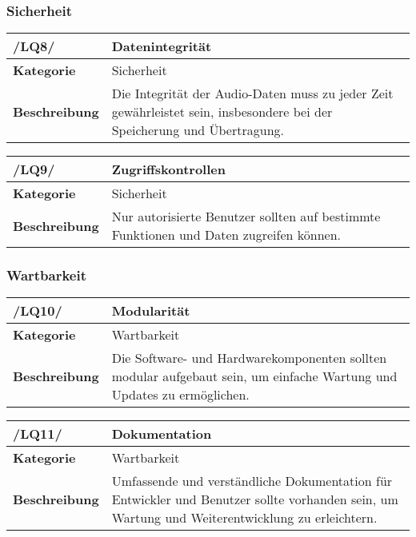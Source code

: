 \subsubsection{Sicherheit}

\begin{table}[h!]
\begin{tabularx}{13cm}{|l|X|}
\hline
\textbf{/LQ8/} & \textbf{Datenintegrität} \\ \hline
\textbf{Kategorie} & Sicherheit \\ \hline
\textbf{Beschreibung} & Die Integrität der Audio-Daten muss zu jeder Zeit gewährleistet sein, insbesondere bei der Speicherung und Übertragung. \\ \hline
\end{tabularx}
\end{table}

\begin{table}[h!]
\begin{tabularx}{13cm}{|l|X|}
\hline
\textbf{/LQ9/} & \textbf{Zugriffskontrollen} \\ \hline
\textbf{Kategorie} & Sicherheit \\ \hline
\textbf{Beschreibung} & Nur autorisierte Benutzer sollten auf bestimmte Funktionen und Daten zugreifen können. \\ \hline
\end{tabularx}
\end{table}

\subsubsection{Wartbarkeit}

\begin{table}[h!]
\begin{tabularx}{13cm}{|l|X|}
\hline
\textbf{/LQ10/} & \textbf{Modularität} \\ \hline
\textbf{Kategorie} & Wartbarkeit \\ \hline
\textbf{Beschreibung} & Die Software- und Hardwarekomponenten sollten modular aufgebaut sein, um einfache Wartung und Updates zu ermöglichen. \\ \hline
\end{tabularx}
\end{table}

\begin{table}[h!]
\begin{tabularx}{13cm}{|l|X|}
\hline
\textbf{/LQ11/} & \textbf{Dokumentation} \\ \hline
\textbf{Kategorie} & Wartbarkeit \\ \hline
\textbf{Beschreibung} & Umfassende und verständliche Dokumentation für Entwickler und Benutzer sollte vorhanden sein, um Wartung und Weiterentwicklung zu erleichtern. \\ \hline
\end{tabularx}
\end{table}

